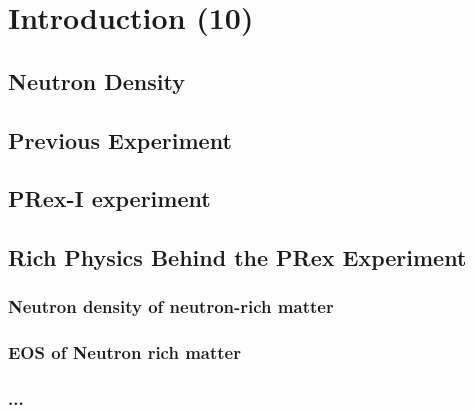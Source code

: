 \chapter{Introduction (10)}


\section{Neutron Density}
\section{Previous Experiment}
\section{PRex-I experiment}
\section{Rich Physics Behind the PRex Experiment}
\subsection{Neutron density of neutron-rich matter}
\subsection{EOS of Neutron rich matter}
\subsection{...}